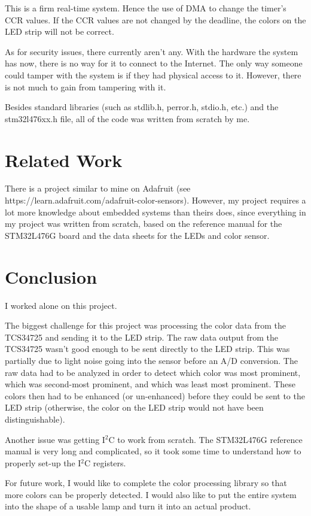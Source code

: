 \documentclass{article}
\begin{document}
This is a firm real-time system.  Hence the use of DMA to change the timer's CCR values.  If the CCR values are not changed by the deadline, the colors on the LED strip will not be correct.  

As for security issues, there currently aren't any. With the hardware the system has now, there is no way for it to connect to the Internet.  The only way someone could tamper with the system is if they had physical access to it.  However, there is not much to gain from tampering with it.

Besides standard libraries (such as stdlib.h, perror.h, stdio.h, etc.) and the stm32l476xx.h file, all of the code was written from scratch by me.  

\section{Related Work}

There is a project similar to mine on Adafruit (see https://learn.adafruit.com/adafruit-color-sensors).  However, my project requires a lot more knowledge about embedded systems than theirs does, since everything in my project was written from scratch, based on the reference manual for the STM32L476G board and the data sheets for the LEDs and color sensor.

\section{Conclusion}

I worked alone on this project.  

The biggest challenge for this project was processing the color data from the TCS34725 and sending it to the LED strip.  The raw data output from the TCS34725 wasn't good enough to be sent directly to the LED strip.  This was partially due to light noise going into the sensor before an A/D conversion.  The raw data had to be analyzed in order to detect which color was most prominent, which was second-most prominent, and which was least most prominent.  These colors then had to be enhanced (or un-enhanced) before they could be sent to the LED strip (otherwise, the color on the LED strip would not have been distinguishable).  

Another issue was getting I$^2$C to work from scratch.  The STM32L476G reference manual is very long and complicated, so it took some time to understand how to properly set-up the I$^2$C registers.  


For future work, I would like to complete the color processing library so that more colors can be properly detected.  I would also like to put the entire system into the shape of a usable lamp and turn it into an actual product.  
 
\end{document}
